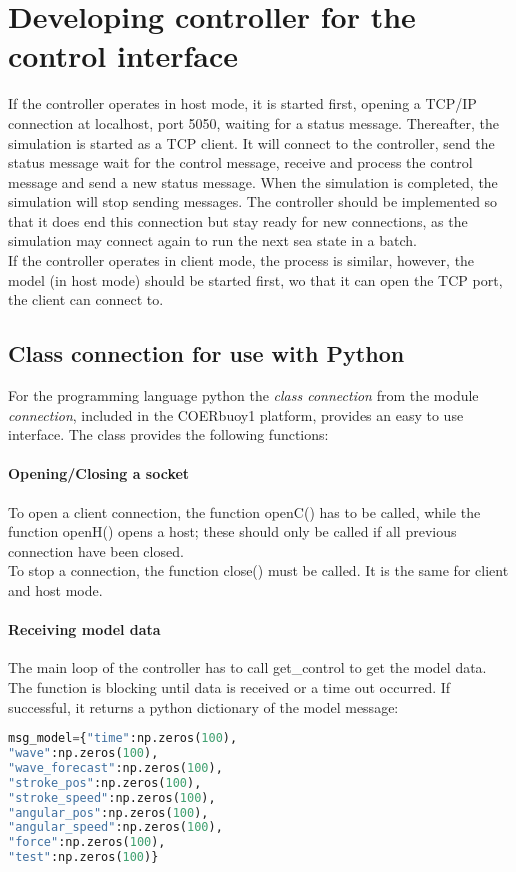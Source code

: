 \documentclass[oneside,10pt,a4paper]{book}
\begin{document}
\section{Developing controller for the control interface}\label{sec:CIpython}
If the controller operates in host mode, it is started first, opening a TCP/IP connection at localhost, port 5050, waiting for a status message. Thereafter, the simulation is started as a TCP client. It will connect to the controller, send the status message wait for the control message, receive and process the control message and send a new status message. When the simulation is completed, the simulation will stop sending messages. The controller should be implemented so that it does end this connection but stay ready for new connections, as the simulation may connect again to run the next sea state in a batch.\\
If the controller operates in client mode, the process is similar, however, the model (in host mode) should be started first, wo that it can open the TCP port, the client can connect to.
\subsection{Class connection for use with Python}
For the programming language python the \textit{class connection} from the module \textit{connection}, included in the COERbuoy1 platform, provides an easy to use interface. The class provides the following functions:
\paragraph{Opening/Closing a socket}
To open a client connection, the function openC() has to be called, while the function openH() opens a host; these should only be called if all previous connection have been closed.\\
To stop a connection, the function close() must be called. It is the same for client and host mode.
\paragraph{Receiving model data}
The main loop of the controller has to call get\_control to get the model data. The function is blocking until data is received or a time out occurred. If successful, it returns a python dictionary of the model message:
\begin{lstlisting}[language=Python]
msg_model={"time":np.zeros(100),
"wave":np.zeros(100),
"wave_forecast":np.zeros(100),
"stroke_pos":np.zeros(100),
"stroke_speed":np.zeros(100),
"angular_pos":np.zeros(100),
"angular_speed":np.zeros(100),
"force":np.zeros(100),
"test":np.zeros(100)}
\end{lstlisting}
\end{document}
